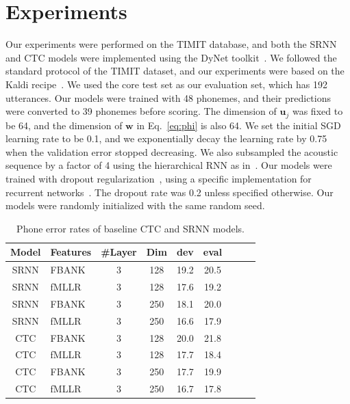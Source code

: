 \documentclass[a4paper]{article}
\begin{document}
\section{Experiments}

Our experiments were performed on the TIMIT database, and both the SRNN and CTC models were implemented using the DyNet toolkit~\cite{neubig2017dynet}. We followed the standard protocol of the TIMIT dataset, and our experiments were based on the Kaldi recipe~\cite{povey2011kaldi}. We used the core test set as our evaluation set, which has 192 utterances. Our models were trained with 48 phonemes, and their predictions were converted to 39 phonemes before scoring. The dimension of $\mathbf{u}_j$ was fixed to be 64, and the dimension of $\mathbf{w}$ in Eq.~\eqref{eq:phi} is also 64. We set the initial SGD learning rate to be 0.1, and we exponentially decay the learning rate by 0.75 when the validation error stopped decreasing. We also subsampled the acoustic sequence by a factor of 4 using the hierarchical RNN as in~\cite{lu2016segmental}. Our models were trained with dropout regularization~\cite{srivastava2014dropout}, using a specific implementation for recurrent networks~\cite{zaremba2014recurrent}. The dropout rate was 0.2 unless specified otherwise. Our models were randomly initialized with the same random seed.

\begin{table}
 \centering \small
\caption{Phone error rates of baseline CTC and SRNN models. }
\label{tab:baseline}
\begin{tabular}{cl|ccccccc}
\hline

\hline
Model & Features  & \#Layer & Dim & dev  & eval \\ \hline
SRNN & FBANK & 3 & 128 & 19.2 & 20.5 \\
SRNN & fMLLR & 3 & 128 & 17.6 & 19.2 \\
SRNN & FBANK & 3& 250 & 18.1 & 20.0\\
SRNN & fMLLR & 3 & 250 & 16.6 & 17.9 \\ \hline
CTC & FBANK & 3&  128 & 20.0 & 21.8 \\ 
CTC & fMLLR & 3 & 128 & 17.7 & 18.4 \\
CTC & FBANK & 3&  250 & 17.7 & 19.9 \\ 
CTC & fMLLR & 3 & 250 & 16.7 & 17.8 \\ \hline

\hline
\end{tabular}
\end{table}
\end{document}
